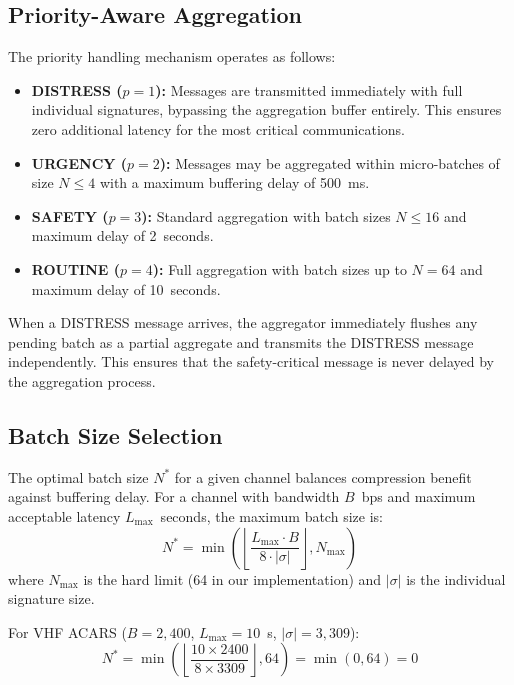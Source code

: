 \documentclass[conference,10pt]{IEEEtran}
\begin{document}
\subsection{Priority-Aware Aggregation}

The priority handling mechanism operates as follows:

\begin{itemize}
    \item \textbf{DISTRESS ($p=1$):} Messages are transmitted immediately with full individual signatures, bypassing the aggregation buffer entirely. This ensures zero additional latency for the most critical communications.
    \item \textbf{URGENCY ($p=2$):} Messages may be aggregated within micro-batches of size $N \leq 4$ with a maximum buffering delay of 500~ms.
    \item \textbf{SAFETY ($p=3$):} Standard aggregation with batch sizes $N \leq 16$ and maximum delay of 2~seconds.
    \item \textbf{ROUTINE ($p=4$):} Full aggregation with batch sizes up to $N=64$ and maximum delay of 10~seconds.
\end{itemize}

When a DISTRESS message arrives, the aggregator immediately flushes any pending batch as a partial aggregate and transmits the DISTRESS message independently. This ensures that the safety-critical message is never delayed by the aggregation process.

\subsection{Batch Size Selection}

The optimal batch size $N^*$ for a given channel balances compression benefit against buffering delay. For a channel with bandwidth $B$~bps and maximum acceptable latency $L_{\max}$~seconds, the maximum batch size is:
\begin{equation}
    N^* = \min\left(\left\lfloor \frac{L_{\max} \cdot B}{8 \cdot |\sigma|} \right\rfloor, N_{\max}\right)
\end{equation}
where $N_{\max}$ is the hard limit (64 in our implementation) and $|\sigma|$ is the individual signature size.

For VHF ACARS ($B = 2{,}400$, $L_{\max} = 10$~s, $|\sigma| = 3{,}309$):
\begin{equation}
    N^* = \min\left(\left\lfloor \frac{10 \times 2400}{8 \times 3309} \right\rfloor, 64\right) = \min(0, 64) = 0
\end{equation}
\end{document}
